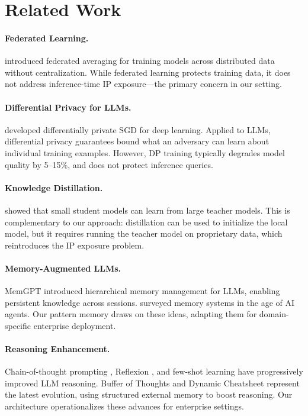 \documentclass[11pt,a4paper]{article}
\begin{document}
\section{Related Work}
\label{sec:related}

\paragraph{Federated Learning.} \citet{mcmahan2017federated} introduced federated averaging for training models across distributed data without centralization. While federated learning protects training data, it does not address inference-time IP exposure---the primary concern in our setting.

\paragraph{Differential Privacy for LLMs.} \citet{abadi2016deep} developed differentially private SGD for deep learning. Applied to LLMs, differential privacy guarantees bound what an adversary can learn about individual training examples. However, DP training typically degrades model quality by 5--15\%, and does not protect inference queries.

\paragraph{Knowledge Distillation.} \citet{hinton2015distilling} showed that small student models can learn from large teacher models. This is complementary to our approach: distillation can be used to initialize the local model, but it requires running the teacher model on proprietary data, which reintroduces the IP exposure problem.

\paragraph{Memory-Augmented LLMs.} MemGPT \citep{packer2023memgpt} introduced hierarchical memory management for LLMs, enabling persistent knowledge across sessions. \citet{hu2025memory} surveyed memory systems in the age of AI agents. Our pattern memory draws on these ideas, adapting them for domain-specific enterprise deployment.

\paragraph{Reasoning Enhancement.} Chain-of-thought prompting \citep{wei2022chain}, Reflexion \citep{shinn2023reflexion}, and few-shot learning \citep{brown2020gpt3} have progressively improved LLM reasoning. Buffer of Thoughts \citep{yang2024bot} and Dynamic Cheatsheet \citep{suzgun2025cheatsheet} represent the latest evolution, using structured external memory to boost reasoning. Our architecture operationalizes these advances for enterprise settings.
\end{document}
